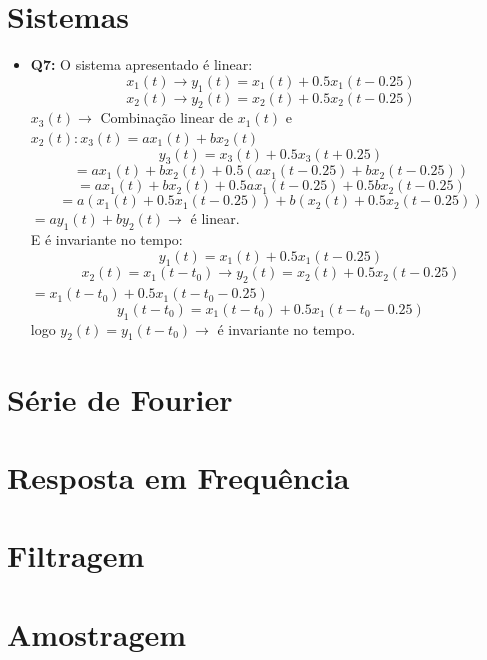 \documentclass[a4paper, 12pt]{article}
\begin{document}
\section{Sistemas}
\begin{itemize}
    \item \textbf{Q7:} O sistema apresentado é linear:
          \[x_1(t) \to y_1(t) = x_1(t) + 0.5x_1(t - 0.25)\]
          \[x_2(t) \to y_2(t) = x_2(t) + 0.5x_2(t - 0.25)\]
          $x_3(t) \to$ Combinação linear de $x_1(t)$ e $x_2(t) : x_3(t) = ax_1(t) + bx_2(t)$\vspace{-5px}
          \[y_3(t) = x_3(t) + 0.5x_3(t + 0.25)\]
          \[= ax_1(t) + bx_2(t) + 0.5(ax_1(t - 0.25) + bx_2(t - 0.25))\]
          \[= ax_1(t) + bx_2(t) + 0.5ax_1(t - 0.25) + 0.5bx_2(t - 0.25)\]
          \[= a(x_1(t) + 0.5x_1(t - 0.25)) + b(x_2(t) + 0.5x_2(t- 0.25))\]
          \hspace{105px}$= ay_1(t) + by_2(t) \to$ é linear.\\
          E é invariante no tempo:
          \[y_1(t) = x_1(t) + 0.5x_1(t - 0.25)\]
          \[x_2(t) = x_1(t - t_0) \to y_2(t) = x_2(t) + 0.5x_2(t - 0.25)\]
          \hspace{184px}$= x_1(t - t_0) + 0.5x_1(t- t_0 - 0.25)$
          \[y_1(t - t_0) = x_1(t - t_0) + 0.5x_1(t - t_0 - 0.25)\]
          \hspace{57px}logo $y_2(t) = y_1(t - t_0) \to$ é invariante no tempo.
\end{itemize}
\newpage
\section{Série de Fourier}
\newpage
\section{Resposta em Frequência}
\newpage
\section{Filtragem}
\newpage
\section{Amostragem}
\end{document}
